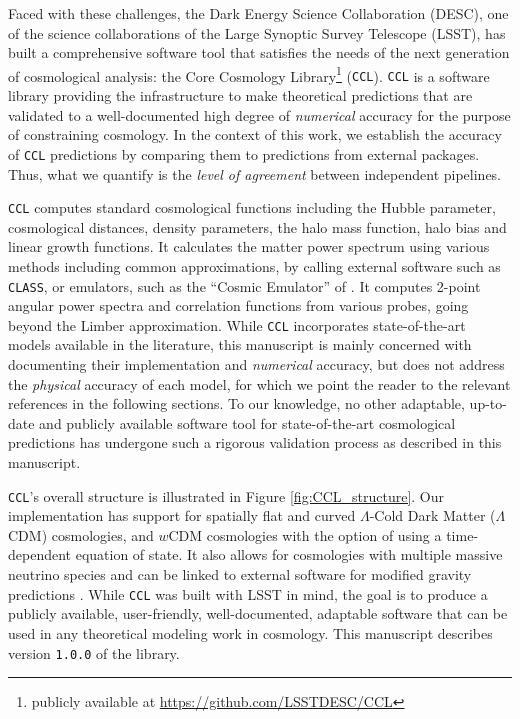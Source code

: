 \documentclass[\docopts]{\docclass}
\newcommand{\ccl}{{\tt CCL}\xspace}
\newcommand{\class}{{\tt CLASS}\xspace}
\newcommand{\hiclass}{{\tt hi$\_$CLASS\xspace}}
\begin{document}
Faced with these challenges, the Dark Energy Science Collaboration (DESC), one of the science collaborations of the Large Synoptic Survey Telescope (LSST), has built a comprehensive software tool that satisfies the needs of the next generation of cosmological analysis: the Core Cosmology Library\footnote{publicly available at \url{https://github.com/LSSTDESC/CCL}} (\ccl). \ccl is a software library providing the infrastructure to make theoretical predictions that are validated to a well-documented high degree of {\it numerical} accuracy for the purpose of constraining cosmology. In the context of this work, we establish the accuracy of \ccl predictions by comparing them to predictions from external packages. Thus, what we quantify is the {\it level of agreement} between independent pipelines.

\ccl computes standard cosmological functions including the Hubble parameter, cosmological distances, density parameters, the halo mass function, halo bias and linear growth functions. It calculates the matter power spectrum using various methods including common approximations, by calling external software such as \class \citep{class}, or emulators, such as the ``Cosmic Emulator'' of \citet{Lawrence17}. It computes 2-point angular power spectra and correlation functions from various probes, going beyond the Limber approximation. While \ccl incorporates state-of-the-art models available in the literature, this manuscript is mainly concerned with documenting their implementation and {\it numerical} accuracy, but does not address the {\it physical} accuracy of each model, for which we point the reader to the relevant references in the following sections. To our knowledge, no other adaptable, up-to-date and publicly available software tool for state-of-the-art cosmological predictions has undergone such a rigorous validation process as described in this manuscript.  

\ccl 's overall structure is illustrated in Figure \ref{fig:CCL_structure}. Our implementation has support for spatially flat and curved $\Lambda$-Cold Dark Matter ($\Lambda$CDM) cosmologies, and $w$CDM cosmologies with the option of using a time-dependent equation of state. It also allows for cosmologies with multiple massive neutrino species and can be linked to external software for modified gravity predictions \citep[\hiclass,][]{Zumalacarregui17}. While \ccl was built with LSST in mind, the goal is to produce a publicly available, user-friendly, well-documented, adaptable software that can be used in any theoretical modeling work in cosmology. This manuscript describes version {\tt 1.0.0} of the library.
\end{document}
